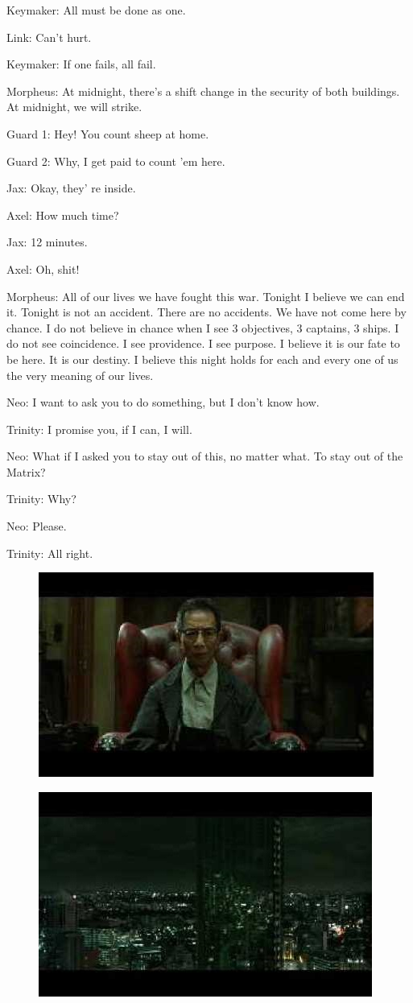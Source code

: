 \documentclass{ctexart}
\newenvironment{myquote}{\color{green} \setlength{\leftskip}{6em} \setlength{\rightskip}{4em} \setlength{\parindent}{-2em}}{\par}
\begin{document}
\begin{myquote}
Keymaker: All must be done as one.

Link: Can't hurt.

Keymaker: If one fails, all fail.

Morpheus: At midnight, there's a shift change in the security of both buildings. At midnight, we will strike.

Guard 1: Hey! You count sheep at home.

Guard 2: Why, I get paid to count 'em here.

Jax: Okay, they' re inside.

Axel: How much time?

Jax: 12 minutes.

Axel: Oh, shit!

Morpheus: All of our lives we have fought this war. Tonight I believe we can end it. Tonight is not an accident. There are no accidents. We have not come here by chance. I do not believe in chance when I see 3 objectives, 3 captains, 3 ships. I do not see coincidence. I see providence. I see purpose. I believe it is our fate to be here. It is our destiny. I believe this night holds for each and every one of us the very meaning of our lives.

Neo: I want to ask you to do something, but I don't know how.

Trinity: I promise you, if I can, I will.

Neo: What if I asked you to stay out of this, no matter what. To stay out of the Matrix?

Trinity: Why?

Neo: Please.

Trinity: All right.
\end{myquote}

\begin{figure}[htb]
\centering
\includegraphics[width=0.5\linewidth]{fig/read_reloaded-144}
\end{figure}

\begin{figure}[htb]
\centering
\includegraphics[width=0.5\linewidth]{fig/read_reloaded-144-1}
\end{figure}
\end{document}

